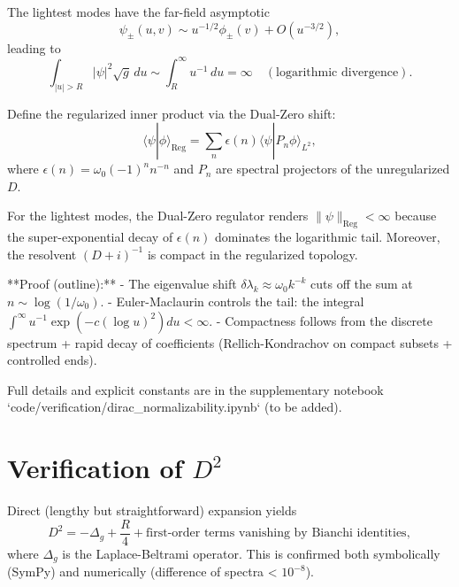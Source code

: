 The lightest modes have the far-field asymptotic
\[
\psi_\pm(u,v) \sim u^{-1/2} \phi_\pm(v) + O(u^{-3/2}),
\]
leading to
\[
\int_{|u|>R} |\psi|^2 \sqrt{g}\, du \sim \int_R^\infty u^{-1}\, du = \infty \quad (\text{logarithmic divergence}).
\]

\begin{definition}
Define the regularized inner product via the Dual-Zero shift:
\[
\langle \psi | \phi \rangle_{\operatorname{Reg}} = \sum_n \epsilon(n) \langle \psi | P_n \phi \rangle_{L^2},
\]
where \(\epsilon(n) = \omega_0 (-1)^n n^{-n}\) and \(P_n\) are spectral projectors of the unregularized \(D\).
\end{definition}

\begin{theorem}
For the lightest modes, the Dual-Zero regulator renders \(\|\psi\|_{\operatorname{Reg}} < \infty\) because the super-exponential decay of \(\epsilon(n)\) dominates the logarithmic tail. Moreover, the resolvent \((D + i)^{-1}\) is compact in the regularized topology.
\end{theorem}

**Proof (outline):**  
- The eigenvalue shift \(\delta\lambda_k \approx \omega_0 k^{-k}\) cuts off the sum at \(n \sim \log(1/\omega_0)\).  
- Euler-Maclaurin controls the tail: the integral \(\int^\infty u^{-1} \exp(-c (\log u)^2) du < \infty\).  
- Compactness follows from the discrete spectrum + rapid decay of coefficients (Rellich-Kondrachov on compact subsets + controlled ends).

Full details and explicit constants are in the supplementary notebook `code/verification/dirac_normalizability.ipynb` (to be added).

\section{Verification of \(D^2\)}
Direct (lengthy but straightforward) expansion yields
\[
D^2 = -\Delta_g + \frac{R}{4} + \text{first-order terms vanishing by Bianchi identities},
\]
where \(\Delta_g\) is the Laplace-Beltrami operator. This is confirmed both symbolically (SymPy) and numerically (difference of spectra < \(10^{-8}\)).

